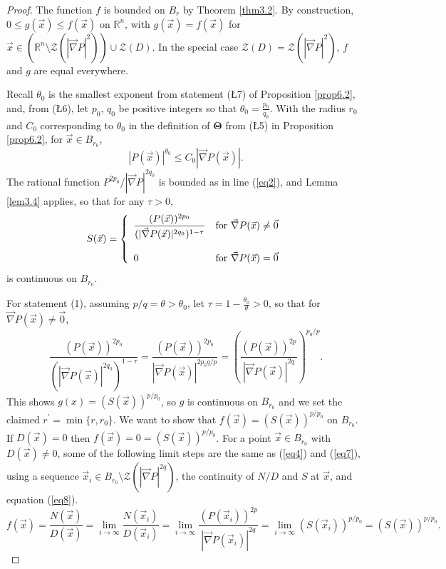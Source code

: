 \documentclass[10pt,a4paper]{amsart}
\newcommand{\re}{\mathbb{R}}
\newcommand{\vv}{\mathcal{Z}}
\begin{document}
\begin{proof}
  The function $f$ is bounded on $B_r$ by Theorem \ref{thm3.2}.  By construction, $0\le g(\vec x)\le f(\vec x)$ on $\re^n$, with $g(\vec x)=f(\vec x)$ for $\vec x\in(\re^n\setminus\vv(|\vec\nabla P|^2))\cup\vv(D)$.   In the special case $\vv(D)=\vv(|\vec\nabla P|^2)$, $f$ and $g$ are equal everywhere.
  
  Recall $\theta_0$ is the smallest exponent from statement (\L7) of Proposition \ref{prop6.2}, and, from (\L6), let $p_0$, $q_0$ be positive integers so that $\displaystyle{\theta_0=\frac{p_0}{q_0}}$.  With the radius $r_0$ and $C_0$ corresponding to $\theta_0$ in the definition of $\mathbf\Theta$ from (\L5) in Proposition \ref{prop6.2}, for $\vec x\in B_{r_0}$, 
\begin{equation}\label{eq4.5}
  |P(\vec x)|^{\theta_0}\le C_0|\vec\nabla P(\vec x)|.
\end{equation}
The rational function $P^{2p_0}/|\vec\nabla P|^{2q_0}$ is bounded as in line (\ref{eq2}), and Lemma \ref{lem3.4} applies, so that for any $\tau>0$,
$$S(\vec x)=\left\{\begin{array}{ll}{\displaystyle{\frac{(P(\vec x))^{2p_0}}{(|\vec\nabla P(\vec x)|^{2q_0})^{1-\tau}}}} & \mbox{\rm{for} $\vec\nabla P(\vec x)\ne\vec0$}\\ & \\0& \mbox{\rm{for} $\vec\nabla P(\vec x)=\vec0$} \end{array}\right.$$
 is continuous on $B_{r_0}$.

 For statement (1), assuming $p/q=\theta>\theta_0$, let $\displaystyle{\tau=1-\frac{\theta_0}{\theta}>0}$, so that for $\vec\nabla P(\vec x)\ne\vec0$,
 \begin{equation}\label{eq8}
   \frac{(P(\vec x))^{2p_0}}{(|\vec\nabla P(\vec x)|^{2q_0})^{1-\tau}}=\frac{(P(\vec x))^{2p_0}}{|\vec\nabla P(\vec x)|^{2p_0q/p}}=\left(\frac{(P(\vec x))^{2p}}{|\vec\nabla P(\vec x)|^{2q}}\right)^{p_0/p}.
   \end{equation}
This shows $g(x)=(S(\vec x))^{p/p_0}$, so $g$ is continuous on $B_{r_0}$ and we set the claimed $r^\prime=\min\{r,r_0\}$.  We want to show that $f(\vec x)=(S(\vec x))^{p/p_0}$ on $B_{r_0}$.  If $D(\vec x)=0$ then $f(\vec x)=0=(S(\vec x))^{p/p_0}$.  For a point $\vec x\in B_{r_0}$ with $D(\vec x)\ne0$, some of the following limit steps are the same as (\ref{eq4}) and (\ref{eq7}), using a sequence $\vec x_i\in B_{r_0}\setminus\vv(|\vec\nabla P|^{2q})$, the continuity of $N/D$ and $S$ at $\vec x$, and equation (\ref{eq8}).
 \begin{equation}
  f(\vec x)=\frac{N(\vec x)}{D(\vec x)}=\lim_{i\to\infty}\frac{N(\vec x_i)}{D(\vec x_i)}=\lim_{i\to\infty}\frac{(P(\vec x_i))^{2p}}{\left|\vec\nabla P(\vec x_i)\right|^{2q}}=\lim_{i\to\infty}(S(\vec x_i))^{p/p_0}=(S(\vec x))^{p/p_0}.\nonumber
\end{equation}


\end{proof}
\end{document}
